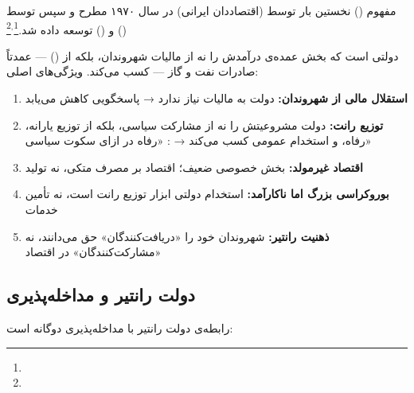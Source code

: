 مفهوم  () نخستین بار توسط  (اقتصاددان ایرانی) در سال ۱۹۷۰ مطرح و سپس توسط  () و  () توسعه داده شد.\footnote{}$^{,}$\footnote{}

\begin{tcolorbox}[defbox, title={تعریف: دولت رانتیر}]
 دولتی است که بخش عمده‌ی درآمدش را نه از مالیات شهروندان، بلکه از  () — عمدتاً صادرات نفت و گاز — کسب می‌کند. ویژگی‌های اصلی:
\begin{enumerate}
\item \textbf{استقلال مالی از شهروندان:} دولت به مالیات نیاز ندارد → پاسخگویی کاهش می‌یابد
\item \textbf{توزیع رانت:} دولت مشروعیتش را نه از مشارکت سیاسی، بلکه از توزیع یارانه، رفاه، و استخدام عمومی کسب می‌کند → : «رفاه در ازای سکوت سیاسی»
\item \textbf{اقتصاد غیرمولد:} بخش خصوصی ضعیف؛ اقتصاد بر مصرف متکی، نه تولید
\item \textbf{بوروکراسی بزرگ اما ناکارآمد:} استخدام دولتی ابزار توزیع رانت است، نه تأمین خدمات
\item \textbf{ذهنیت رانتیر:} شهروندان خود را «دریافت‌کنندگان» حق می‌دانند، نه «مشارکت‌کنندگان» در اقتصاد
\end{enumerate}
\end{tcolorbox}

\subsection{دولت رانتیر و مداخله‌پذیری}
\label{subsec:ch12-rentier-vulnerability}

رابطه‌ی دولت رانتیر با مداخله‌پذیری دوگانه است:

